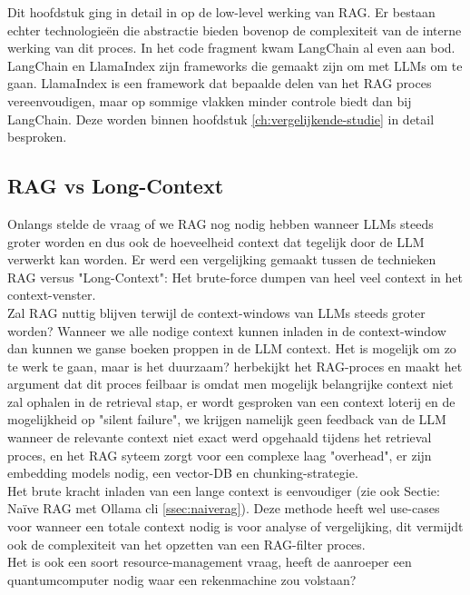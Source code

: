 Dit hoofdstuk ging in detail in op de low-level werking van RAG. Er bestaan echter technologieën die abstractie bieden bovenop de complexiteit van de interne werking van dit proces. In het code fragment kwam LangChain al even aan bod.
LangChain en LlamaIndex zijn frameworks die gemaakt zijn om met LLMs om te gaan. LlamaIndex is een framework dat bepaalde delen van het RAG proces vereenvoudigen, maar op sommige vlakken minder controle biedt dan bij LangChain. Deze worden binnen hoofdstuk \ref{ch:vergelijkende-studie} in detail besproken.

\subsection{RAG vs Long-Context}
\label{ssec:ragvslongcontext}

Onlangs stelde \textcite{IBM2026a} de vraag of we RAG nog nodig hebben wanneer LLMs steeds groter worden en dus ook de hoeveelheid context dat tegelijk door de LLM verwerkt kan worden. Er werd een vergelijking gemaakt tussen de technieken RAG versus "Long-Context": Het brute-force dumpen van heel veel context in het context-venster. \\

Zal RAG nuttig blijven terwijl de context-windows van LLMs steeds groter worden? Wanneer we alle nodige context kunnen inladen in de context-window dan kunnen we ganse boeken proppen in de LLM context. Het is mogelijk om zo te werk te gaan, maar is het duurzaam? \textcite{IBM2026a} herbekijkt het RAG-proces en maakt het argument dat dit proces feilbaar is omdat men mogelijk belangrijke context niet zal ophalen in de retrieval stap, er wordt gesproken van een context loterij en de mogelijkheid op "silent failure", we krijgen namelijk geen feedback van de LLM wanneer de relevante context niet exact werd opgehaald tijdens het retrieval proces, en het RAG syteem zorgt voor een complexe laag "overhead", er zijn embedding models nodig, een vector-DB en chunking-strategie. \\

Het brute kracht inladen van een lange context is eenvoudiger (zie ook Sectie: Naïve RAG met Ollama cli \ref{ssec:naiverag}). Deze methode heeft wel use-cases voor wanneer een totale context nodig is voor analyse of vergelijking, dit vermijdt ook de complexiteit van het opzetten van een RAG-filter proces. \\

Het is ook een soort resource-management vraag, heeft de aanroeper een quantumcomputer nodig waar een rekenmachine zou volstaan? \\

